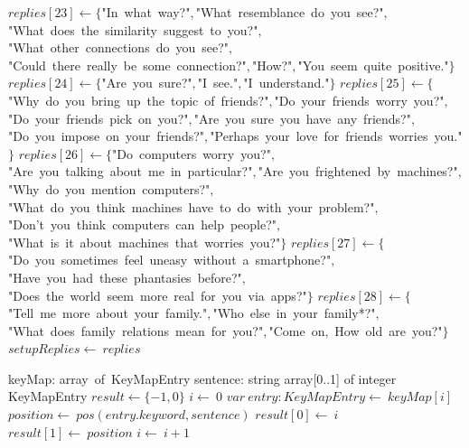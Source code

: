 \documentclass[a4paper,10pt]{article}
\begin{document}
\begin{algorithm}
\begin{algorithmic}[5]
  \State \(replies[23]\gets\{\)"{}In\ what\ way?"{}\(,\)"{}What\ resemblance\ do\ you\ see?"{}\(,\)"{}What\ does\ the\ similarity\ suggest\ to\ you?"{}\(,\)"{}What\ other\ connections\ do\ you\ see?"{}\(,\)"{}Could\ there\ really\ be\ some\ connection?"{}\(,\)"{}How?"{}\(,\)"{}You\ seem\ quite\ positive."{}\(\}\)
  \State \(replies[24]\gets\{\)"{}Are\ you\ sure?"{}\(,\)"{}I\ see."{}\(,\)"{}I\ understand."{}\(\}\)
  \State \(replies[25]\gets\{\)"{}Why\ do\ you\ bring\ up\ the\ topic\ of\ friends?"{}\(,\)"{}Do\ your\ friends\ worry\ you?"{}\(,\)"{}Do\ your\ friends\ pick\ on\ you?"{}\(,\)"{}Are\ you\ sure\ you\ have\ any\ friends?"{}\(,\)"{}Do\ you\ impose\ on\ your\ friends?"{}\(,\)"{}Perhaps\ your\ love\ for\ friends\ worries\ you."{}\(\}\)
  \State \(replies[26]\gets\{\)"{}Do\ computers\ worry\ you?"{}\(,\)"{}Are\ you\ talking\ about\ me\ in\ particular?"{}\(,\)"{}Are\ you\ frightened\ by\ machines?"{}\(,\)"{}Why\ do\ you\ mention\ computers?"{}\(,\)"{}What\ do\ you\ think\ machines\ have\ to\ do\ with\ your\ problem?"{}\(,\)"{}Don'{}t\ you\ think\ computers\ can\ help\ people?"{}\(,\)"{}What\ is\ it\ about\ machines\ that\ worries\ you?"{}\(\}\)
  \State \(replies[27]\gets\{\)"{}Do\ you\ sometimes\ feel\ uneasy\ without\ a\ smartphone?"{}\(,\)"{}Have\ you\ had\ these\ phantasies\ before?"{}\(,\)"{}Does\ the\ world\ seem\ more\ real\ for\ you\ via\ apps?"{}\(\}\)
  \State \(replies[28]\gets\{\)"{}Tell\ me\ more\ about\ your\ family."{}\(,\)"{}Who\ else\ in\ your\ family*?"{}\(,\)"{}What\ does\ family\ relations\ mean\ for\ you?"{}\(,\)"{}Come\ on,\ How\ old\ are\ you?"{}\(\}\)
  \State \(setupReplies\gets\ replies\)
\EndFunction
\end{algorithmic}
\end{algorithm}


\begin{algorithm}
\caption{findKeyword(2)}
\begin{algorithmic}[5]
\State {}
\State {}
\State {}
\State {}
\State {}
\State {}
    \State keyMap: array\ of\ KeyMapEntry
    \State sentence: string
  \EndDecl
    \State array[0..1] of integer
  \EndDecl
    \State KeyMapEntry
  \EndDecl
  \State \(result\gets\{-1,0\}\)
  \State \(i\gets\ 0\)
    \State \(var\ entry:KeyMapEntry\gets\ keyMap[i]\)
    \State \(position\gets\ pos(entry.keyword,sentence)\)
      \State \(result[0]\gets\ i\)
      \State \(result[1]\gets\ position\)
    \EndIf
    \State \(i\gets\ i+1\)
  \EndWhile
\EndFunction
\end{algorithmic}
\end{algorithm}
\end{document}
